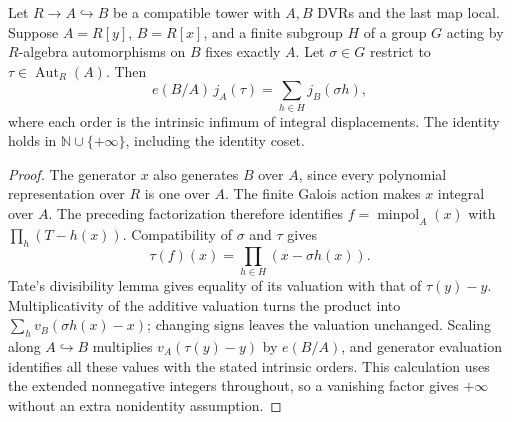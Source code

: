 \begin{lemma}
\label{fw:scaled-tate-identity}
\leanok
Let $R\to A\hookrightarrow B$ be a compatible tower with $A,B$ DVRs
and the last map local. Suppose $A=R[y]$, $B=R[x]$, and a finite
subgroup $H$ of a group $G$ acting by $R$-algebra automorphisms on
$B$ fixes exactly $A$. Let $\sigma\in G$ restrict to
$\tau\in\operatorname{Aut}_R(A)$. Then
\[
 e(B/A)\,j_A(\tau)=\sum_{h\in H}j_B(\sigma h),
\]
where each order is the intrinsic infimum of integral displacements.
The identity holds in $\mathbb N\cup\{+\infty\}$, including the
identity coset.
\end{lemma}
\begin{proof}
The generator $x$ also generates $B$ over $A$, since every polynomial
representation over $R$ is one over $A$. The finite Galois action
makes $x$ integral over $A$. The preceding factorization therefore
identifies $f=\operatorname{minpol}_A(x)$ with
$\prod_h(T-h(x))$. Compatibility of $\sigma$ and $\tau$ gives
\[
 \tau(f)(x)=\prod_{h\in H}(x-\sigma h(x)).
\]
Tate's divisibility lemma gives equality of its valuation with that of
$\tau(y)-y$. Multiplicativity of the additive valuation turns the
product into $\sum_h v_B(\sigma h(x)-x)$; changing signs leaves the
valuation unchanged. Scaling along $A\hookrightarrow B$ multiplies
$v_A(\tau(y)-y)$ by $e(B/A)$, and generator evaluation identifies
all these values with the stated intrinsic orders. This calculation
uses the extended nonnegative integers throughout, so a vanishing
factor gives $+\infty$ without an extra nonidentity assumption.
\end{proof}

